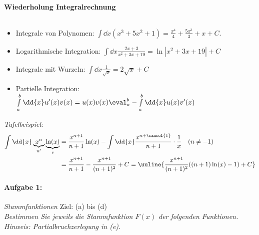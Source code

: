 
\paragraph{Wiederholung Integralrechnung}$~$

\begin{itemize}
    \item Integrale von Polynomen: $\int \dd{x} (x^3+5x^2+1) = \frac{x^4}{4}+\frac{5x^3}{3} + x + C.$ 
    \item Logarithmische Integration: $\int \dd{x} \frac{2x+3}{x^2+3x+19} = \ln|x^2+3x+19| + C$ 
    \item Integrale mit Wurzeln: $\int \dd{x} \frac{1}{\sqrt{x}} = 2\sqrt{x} + C$
    \item Partielle Integration: $\int\limits_{a}^{b} \dd{x} u'(x) v(x) = u(x) v(x)\eval_a^b - \int\limits_{a}^{b}\dd{x} u(x) v'(x)$
\end{itemize}

\emph{Tafelbeispiel:}
\begin{align}
    \int \dd{x} \underbrace{x^n}_{u'} \underbrace{\ln(x)}_{v} &= \frac{x^{n+1}}{n+1} \ln(x) - \int \dd{x} \frac{x^{n+\cancel{1}}}{n+1}\cdot \frac{1}{x} \quad (n\neq -1) \\
    &= \frac{x^{n+1}}{n+1} - \frac{x^{n+1}}{(n+1)^2} + C= \uuline{\frac{x^{n+1}}{(n+1)^2}((n+1)\ln(x)-1) + C}
\end{align}

\paragraph{Aufgabe 1: } \emph{Stammfunktionen} \hfill Ziel: (a) bis (d)\\[0.2cm]
\emph{Bestimmen Sie jeweils die Stammfunktion $F(x)$ der folgenden Funktionen.}
\emph{Hinweis: Partialbruchzerlegung in (e).}\\[1cm]

